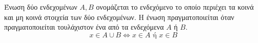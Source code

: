 Ένωση δύο ενδεχομένων $ A,B $ ονομάζεται το ενδεχόμενο το οποίο περιέχει τα κοινά και μη κοινά στοιχεία των δύο ενδεχομένων. Η ένωση πραγματοποιείται όταν πραγματοποιείται τουλάχιστον ένα από τα ενδεχόμενα $ A $ ή $ B $. \[ x\in A\cup B\Leftrightarrow x\in A \textrm{ ή }x\in B \]
